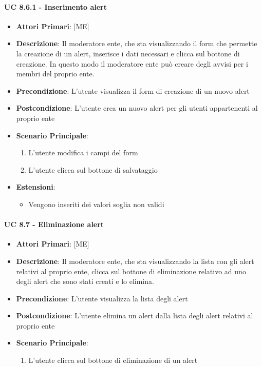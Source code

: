			\paragraph{UC 8.6.1 - Inserimento alert}
			\begin{itemize}
				\item \textbf{Attori Primari}: [ME]
				\item \textbf{Descrizione}: Il moderatore ente, che sta visualizzando il form che permette la creazione di un alert, inserisce i dati necessari e clicca sul bottone di creazione. In questo modo il moderatore ente può creare degli avvisi per i membri del proprio ente.
				\item \textbf{Precondizione}: L'utente visualizza il form di creazione di un nuovo alert
				\item \textbf{Postcondizione}: L'utente crea un nuovo alert per gli utenti appartenenti al proprio ente 
				\item \textbf{Scenario Principale}:
				\begin{enumerate}
					\item{L'utente modifica i campi del form}
					\item{L'utente clicca sul bottone di salvataggio}
				\end{enumerate}
				\item \textbf{Estensioni}:
					\begin{itemize}
						\item Vengono inseriti dei valori soglia non validi
					\end{itemize}	
			\end{itemize}

			\paragraph{UC 8.7 - Eliminazione alert}
			\begin{itemize}
				\item \textbf{Attori Primari}: [ME]
				\item \textbf{Descrizione}: Il moderatore ente, che sta visualizzando la lista con gli alert relativi al proprio ente, clicca sul bottone di eliminazione relativo ad uno degli alert che sono stati creati e lo elimina.
				\item \textbf{Precondizione}: L'utente visualizza la lista degli alert
				\item \textbf{Postcondizione}: L'utente elimina un alert dalla lista degli alert relativi al proprio ente 
				\item \textbf{Scenario Principale}:
				\begin{enumerate}
					\item{L'utente clicca sul bottone di eliminazione di un alert}
				\end{enumerate}
			\end{itemize}

